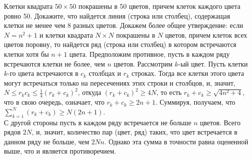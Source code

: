 \problem{}
Клетки квадрата $50 \times 50$ покрашены в 50 цветов, причем клеток каждого
цвета ровно 50.
Докажите, что найдется линия (строка или столбец), содержащая клетки не менее
чем 8 разных цветов.
\solution
Докажем более общее утверждение: если $N = n^2 + 1$ и клетки квадрата
$N \times N$ покрашены в $N$ цветов, причем клеток всех цветов поровну, то
найдется ряд (строка или столбец) в котором встречаются клетки хотя бы $n + 1$
цвета.
Предположим противное, пусть в каждом ряду встречаются клетки не более, чем $n$
цветов.
Рассмотрим $k$-ый цвет.
Пусть клетки $k$-го цвета встречаются в $c_k$ столбцах и $r_k$ строках.
Тогда все клетки этого цвета могут встречаться только на пересечениях этих
строки и столбцов, и, значит, $N \leq r_k c_k \leq \frac{1}{4}(r_k + c_k)^2$,
откуда $(r_k + c_k)^2 \geq 4 N$, то есть $r_k + c_k \geq \sqrt{4 n^2 + 4}$, что
в свою очередь, означает, что $r_k + c_k \geq 2 n + 1$.
Суммируя, получаем, что  $\sum_{k = 1}^N (r_k + c_k) \geq N(2 n + 1)$.
\\
С другой стороны пусть в каждом ряду встречается не больше $n$ цветов.
Всего рядов $2 N$, и, значит, количество пар (цвет, ряд) таких, что цвет
встречается в данном ряду не больше, чем $2 N n$.
Однако эта сумма в точности равна оцененной выше, что и является противоречием.
\endproblem
